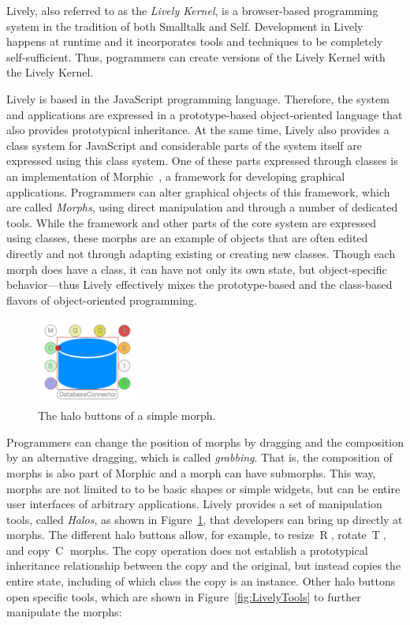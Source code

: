 Lively, also referred to as the \emph{Lively Kernel}, is a browser-based programming system in the tradition of both Smalltalk and Self.
Development in Lively happens at runtime and it incorporates tools and techniques to be completely self-sufficient.
Thus, pogrammers can create versions of the Lively Kernel with the Lively Kernel.

Lively is based in the JavaScript programming language.
Therefore, the system and applications are expressed in a prototype-based object-oriented language that also provides prototypical inheritance.
At the same time, Lively also provides a class system for JavaScript and considerable parts of the system itself are expressed using this class system.
One of these parts expressed through classes is an implementation of Morphic~\cite{Maloney1995Mor}, a framework for developing graphical applications.
Programmers can alter graphical objects of this framework, which are called \emph{Morphs}, using direct manipulation and through a number of dedicated tools.
While the framework and other parts of the core system are expressed using classes, these morphs are an example of objects that are often edited directly and not through adapting existing or creating new classes.
Though each morph does have a class, it can have not only its own state, but object-specific behavior---thus Lively effectively mixes the prototype-based and the class-based flavors of object-oriented programming.

\begin{figure}[h]
    \centering
    \includegraphics[width=0.3\textwidth]{figures/2_background/1_halos.pdf}
    \caption{The halo buttons of a simple morph.}
    \label{fig:Halos}
\end{figure}

Programmers can change the position of morphs by dragging and the composition by an alternative dragging, which is called \emph{grabbing}.
That is, the composition of morphs is also part of Morphic and a morph can have submorphs.
This way, morphs are not limited to to be basic shapes or simple widgets, but can be entire user interfaces of arbitrary applications.
Lively provides a set of manipulation tools, called \emph{Halos}, as shown in Figure~\ref{fig:Halos}, that developers can bring up directly at morphs.
The different halo buttons allow, for example, to resize~\textcircled{R}, rotate~\textcircled{T}, and copy~\textcircled{C} morphs.
The copy operation does not establish a prototypical inheritance relationship between the copy and the original, but instead copies the entire state, including of which class the copy is an instance.
Other halo buttons open specific tools, which are shown in Figure~\ref{fig:LivelyTools} to further manipulate the morphs:

